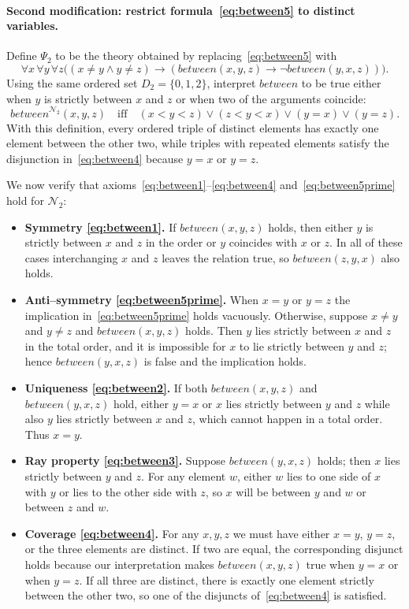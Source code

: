 \documentclass[12pt]{article}
\begin{document}
\paragraph{Second modification: restrict formula~\eqref{eq:between5} to distinct variables.}
Define $\Psi_2$ to be the theory obtained by replacing~\eqref{eq:between5} with
\begin{equation}
\forall x\,\forall y\,\forall z\bigl((x\neq y \wedge y\neq z) \to (\mathit{between}(x,y,z) \to \neg\mathit{between}(y,x,z))\bigr).
\label{eq:between5prime}
\end{equation}
Using the same ordered set $D_2=\{0,1,2\}$, interpret $\mathit{between}$ to be true either when $y$ is strictly between $x$ and $z$ or when two of the arguments coincide:
\[
\mathit{between}^{\mathcal{N}_2}(x,y,z)\quad\text{iff}\quad (x<y<z)\lor(z<y<x)\lor(y=x)\lor(y=z).
\]
With this definition, every ordered triple of distinct elements has exactly one element between the other two, while triples with repeated elements satisfy the disjunction in~\eqref{eq:between4} because $y=x$ or $y=z$.

We now verify that axioms~\eqref{eq:between1}--\eqref{eq:between4} and~\eqref{eq:between5prime} hold for $\mathcal{N}_2$:

\begin{itemize}
  \item \textbf{Symmetry \eqref{eq:between1}.}  If $\mathit{between}(x,y,z)$ holds, then either $y$ is strictly between $x$ and $z$ in the order or $y$ coincides with $x$ or $z$.  In all of these cases interchanging $x$ and $z$ leaves the relation true, so $\mathit{between}(z,y,x)$ also holds.
  \item \textbf{Anti--symmetry \eqref{eq:between5prime}.}  When $x=y$ or $y=z$ the implication in~\eqref{eq:between5prime} holds vacuously.  Otherwise, suppose $x\neq y$ and $y\neq z$ and $\mathit{between}(x,y,z)$ holds.  Then $y$ lies strictly between $x$ and $z$ in the total order, and it is impossible for $x$ to lie strictly between $y$ and $z$; hence $\mathit{between}(y,x,z)$ is false and the implication holds.
  \item \textbf{Uniqueness \eqref{eq:between2}.}  If both $\mathit{between}(x,y,z)$ and $\mathit{between}(y,x,z)$ hold, either $y=x$ or $x$ lies strictly between $y$ and $z$ while also $y$ lies strictly between $x$ and $z$, which cannot happen in a total order.  Thus $x=y$.
  \item \textbf{Ray property \eqref{eq:between3}.}  Suppose $\mathit{between}(y,x,z)$ holds; then $x$ lies strictly between $y$ and $z$.  For any element $w$, either $w$ lies to one side of $x$ with $y$ or lies to the other side with $z$, so $x$ will be between $y$ and $w$ or between $z$ and $w$.
  \item \textbf{Coverage \eqref{eq:between4}.}  For any $x,y,z$ we must have either $x=y$, $y=z$, or the three elements are distinct.  If two are equal, the corresponding disjunct holds because our interpretation makes $\mathit{between}(x,y,z)$ true when $y=x$ or when $y=z$.  If all three are distinct, there is exactly one element strictly between the other two, so one of the disjuncts of~\eqref{eq:between4} is satisfied.
\end{itemize}
\end{document}
